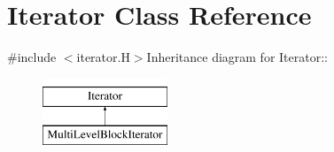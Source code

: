 \hypertarget{classIterator}{
\section{Iterator Class Reference}
\label{classIterator}
}


{\ttfamily \#include $<$iterator.H$>$}Inheritance diagram for Iterator::\begin{figure}[H]
\begin{center}
\leavevmode
\includegraphics[height=2cm]{classIterator}
\end{center}
\end{figure}

